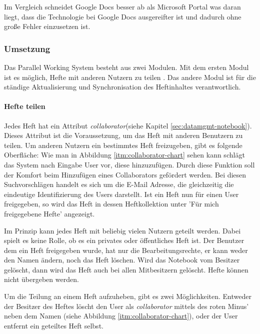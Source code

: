 Im Vergleich schneidet Google Docs besser ab als Microsoft Portal was daran liegt, dass die Technologie bei Google Docs ausgereifter ist und dadurch ohne große Fehler einzusetzen ist.
\newpage
\subsubsection{Umsetzung}
Das Parallel Working System besteht aus zwei Modulen. Mit dem ersten Modul ist es möglich, Hefte mit anderen Nutzern zu teilen . Das andere Modul ist für die ständige Aktualisierung und Synchronisation des Heftinhaltes verantwortlich. 
\paragraph{Hefte teilen}
Jedes Heft hat ein Attribut \textit{collaborator}(siehe Kapitel \ref{sec:datamgmt-notebook}). Dieses Attribut ist die Voraussetzung, um das Heft mit anderen Benutzern zu teilen. 
Um anderen Nutzern ein bestimmtes Heft freizugeben, gibt es folgende Oberfläche:
Wie man in Abbildung \ref{itm:collaborator-chart} sehen kann schlägt das System nach Eingabe User vor, diese hinzuzufügen. Durch diese Funktion soll der Komfort beim Hinzufügen eines Collaborators gefördert werden. Bei diesen Suchvorschlägen handelt es sich um die E-Mail Adresse, die gleichzeitig die eindeutige Identifizierung des Users darstellt.
Ist ein Heft nun für einen User freigegeben, so wird das Heft in dessen Heftkollektion unter 'Für mich freigegebene Hefte' angezeigt. 


\newpage

Im Prinzip kann jedes Heft mit beliebig vielen Nutzern geteilt werden. Dabei spielt es keine Rolle, ob es ein privates oder öffentliches Heft ist. 
Der Benutzer dem ein Heft freigegeben wurde, hat nur die Bearbeitungsrechte, er kann weder den Namen ändern, noch das Heft löschen. Wird das Notebook vom Besitzer gelöscht, dann wird das Heft auch bei allen Mitbesitzern gelöscht. Hefte können nicht übergeben werden.

Um die Teilung an einem Heft aufzuheben, gibt es zwei Möglichkeiten. Entweder der Besitzer des Heftes löscht den User als \textit{collaborator} mittels des roten Minus' neben dem Namen (siehe Abbildung \ref{itm:collaborator-chart}), oder der User entfernt ein geteiltes Heft selbst.
